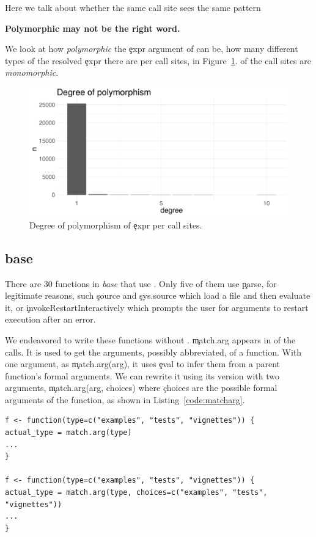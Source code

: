 \documentclass[conference]{IEEEtran}
\begin{document}
Here we talk about whether the same call site sees the same pattern

{\bf Polymorphic may not be the right word.}

We look at how \emph{polymorphic} the \c{expr} argument of \eval can be, \ie
how many different types of the resolved \c{expr} there are per call sites,
in Figure~\ref{fig:polymorphism}. \PercentMonomorphic of the call sites are
\emph{monomorphic}.

\begin{figure}[!h]
	\centering
    \includegraphics[width=\columnwidth]{polymorphism}
    \caption{Degree of polymorphism of \c{expr} per call sites.} \label{fig:polymorphism}
\end{figure}

\subsection{base}

There are 30 functions in \emph{base} that use \eval. Only five of them use \c{parse}, for legitimate reasons, such \c{source} and \c{sys.source} which load a file and then evaluate it, or \c{invokeRestartInteractively} which prompts the user for arguments to restart execution after an error.

We endeavored  to write these functions without \eval. \c{match.arg} appears in \MatchArgPercent of the \eval calls. It is used to get the arguments, possibly abbreviated, of a function. With one argument, as \c{match.arg(arg)}, it uses \c{eval} to infer them from a parent function's formal arguments. We can rewrite it using its version with two arguments, \c{match.arg(arg, choices)} where \c{choices} are the possible formal arguments of the function, as shown in Listing~\ref{code:matcharg}.

\begin{lstlisting}[caption={Rewriting \c{match.arg} without \eval}, label=code:matcharg]
f <- function(type=c("examples", "tests", "vignettes")) {
actual_type = match.arg(type)
...
}

f <- function(type=c("examples", "tests", "vignettes")) {
actual_type = match.arg(type, choices=c("examples", "tests", "vignettes"))
...
}
\end{lstlisting}
\end{document}
